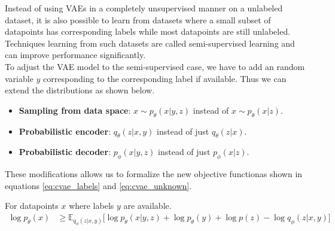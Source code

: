 Instead of using VAEs in a completely unsupervised manner on a unlabeled dataset, it is also possible to learn from datasets where a small subset of datapoints has corresponding labels while most datapoints are still unlabeled.
Techniques learning from such datasets are called semi-supervised learning and can improve performance significantly.\\

To adjust the VAE model to the semi-supervised case, we have to add an random variable $y$ corresponding to the corresponding label if available.
Thus we can extend the distributions as shown below.




\begin{itemize}
\item \textbf{Sampling from data space}: $x \sim p_\theta(x|y,z)$ instead of $x \sim p_\theta(x|z)$.\\
\item \textbf{Probabilistic encoder}: $q_\theta(z|x,y)$ instead of just $q_\theta(z|x)$.\\
\item \textbf{Probabilistic decoder}: $p_\phi(x|y,z)$ instead of just $p_\phi(x|z)$.\\
\end{itemize}

These modifications allows us to formalize the new objective functionas shown in equations \ref{eq:cvae_labels} and \ref{eq:cvae_unknown}.

For datapoints $x$ where labels $y$ are available.
\begin{align}
  \label{eq:cvae_labels}
  \log p_\theta(x) &\geq \mathbb{E}_{q_\phi(z|x,y)} \bigg[\log p_\theta(x|y,z) + \log p_\theta(y) + \log p(z) - \log q_\phi(z|x,y)\bigg]
\end{align}

